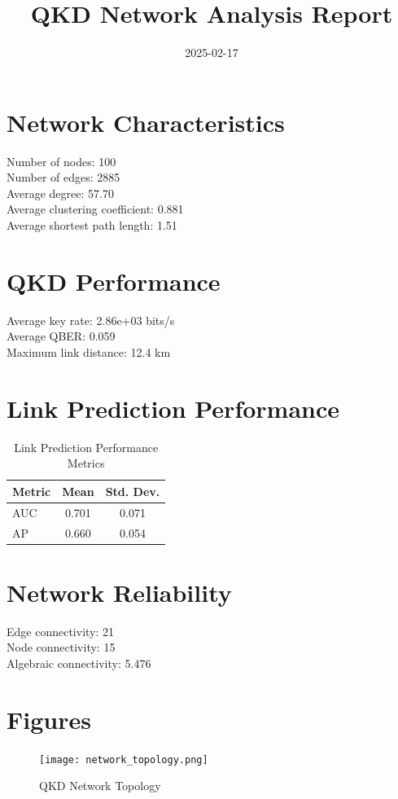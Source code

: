 \documentclass{article}
\title{QKD Network Analysis Report}
\date{2025-02-17}
\begin{document}
    \maketitle

    \section{Network Characteristics}
    Number of nodes: 100 \\
    Number of edges: 2885 \\
    Average degree: 57.70 \\
    Average clustering coefficient: 0.881 \\
    Average shortest path length: 1.51

    \section{QKD Performance}
    Average key rate: 2.86e+03 bits/s \\
    Average QBER: 0.059 \\
    Maximum link distance: 12.4 km

    \section{Link Prediction Performance}
    \begin{table}[H]
    \centering
    \begin{tabular}{lcc}
    \toprule
    Metric & Mean & Std. Dev. \\
    \midrule
    AUC & 0.701 &
        0.071 \\
    AP & 0.660 &
        0.054 \\
    \bottomrule
    \end{tabular}
    \caption{Link Prediction Performance Metrics}
    \end{table}

    \section{Network Reliability}
    Edge connectivity: 21 \\
    Node connectivity: 15 \\
    Algebraic connectivity: 5.476

    \section{Figures}
    \begin{figure}[H]
    \centering
    \texttt{[image: network\_topology.png]}
    \caption{QKD Network Topology}
    \end{figure}
\end{document}
